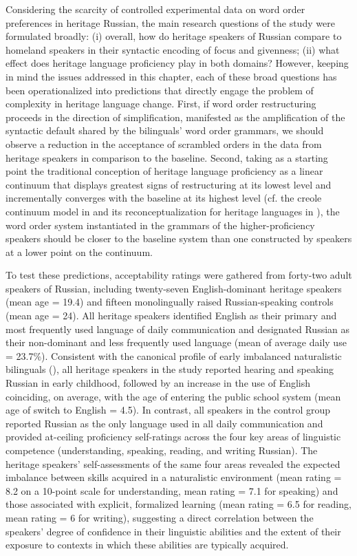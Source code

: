 \documentclass[output=paper]{langscibook}
\begin{document}
Considering the scarcity of controlled experimental data on word order preferences in heritage Russian, the main research questions of the study were formulated broadly: (i) overall, how do heritage speakers of Russian compare to homeland speakers in their syntactic encoding of focus and givenness; (ii) what effect does heritage language proficiency play in both domains? However, keeping in mind the issues addressed in this chapter, each of these broad questions has been operationalized into predictions that directly engage the problem of complexity in heritage language change. First, if word order restructuring proceeds in the direction of simplification, manifested as the amplification of the syntactic default shared by the bilinguals’ word order grammars, we should observe a reduction in the acceptance of scrambled orders in the data from heritage speakers in comparison to the baseline. Second, taking as a starting point the traditional conception of heritage language proficiency as a linear continuum that displays greatest signs of restructuring at its lowest level and incrementally converges with the baseline at its highest level (cf. the creole continuum model in \citealt{Bickerton1975} and its reconceptualization for heritage languages in \citealt{PolinskyKagan2007}), the word order system instantiated in the grammars of the higher-proficiency speakers should be closer to the baseline system than one constructed by speakers at a lower point on the continuum.

To test these predictions, acceptability ratings were gathered from forty-two adult speakers of Russian, including twenty-seven English-dominant heritage speakers (mean age = 19.4) and fifteen monolingually raised Russian-speaking controls (mean age = 24). All heritage speakers identified English as their primary and most frequently used language of daily communication and designated Russian as their non-dominant and less frequently used language (mean of average daily use = 23.7\%). Consistent with the canonical profile of early imbalanced naturalistic bilinguals (\citealt{AalberseMuysken2019, Montrul2016, Polinsky2018}), all heritage speakers in the study reported hearing and speaking Russian in early childhood, followed by an increase in the use of English coinciding, on average, with the age of entering the public school system (mean age of switch to English = 4.5). In contrast, all speakers in the control group reported Russian as the only language used in all daily communication and provided at-ceiling proficiency self-ratings across the four key areas of linguistic competence (understanding, speaking, reading, and writing Russian). The heritage speakers’ self-assessments of the same four areas revealed the expected imbalance between skills acquired in a naturalistic environment (mean rating = 8.2 on a 10-point scale for understanding, mean rating = 7.1 for speaking) and those associated with explicit, formalized learning (mean rating = 6.5 for reading, mean rating = 6 for writing), suggesting a direct correlation between the speakers’ degree of confidence in their linguistic abilities and the extent of their exposure to contexts in which these abilities are typically acquired.
\end{document}
